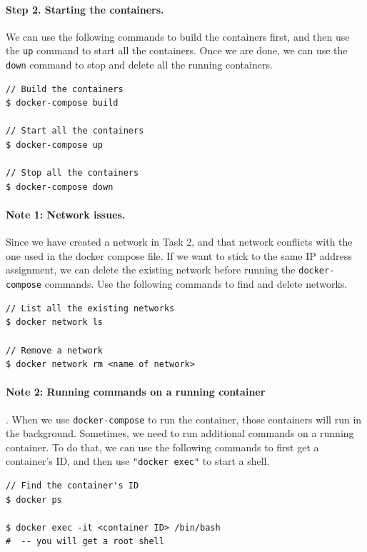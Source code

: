 \paragraph{Step 2. Starting the containers.}
We can use the following commands to build the containers first, and then 
use the \texttt{up} command to start all the containers. Once we are done,
we can use the \texttt{down} command to stop and delete all the running containers.  


\begin{lstlisting}
// Build the containers 
$ docker-compose build

// Start all the containers 
$ docker-compose up

// Stop all the containers
$ docker-compose down
\end{lstlisting}


\paragraph{Note 1: Network issues.}
Since we have created a network in Task 2, and that network
conflicts with the one used in the docker compose file. If we want to 
stick to the same IP address assignment, we can delete the existing 
network before running the \texttt{docker-compose} commands. 
Use the following commands to find and delete networks. 


\begin{lstlisting}
// List all the existing networks 
$ docker network ls 

// Remove a network
$ docker network rm <name of network>
\end{lstlisting}
 

\paragraph{Note 2: Running commands on a running container}.
When we use \texttt{docker-compose} to run the container, those 
containers will run in the background. 
Sometimes, we need to run additional commands on a running container.
To do that, we can use the following commands to first 
get a container's ID, and then use \texttt{"docker exec"} 
to start a shell. 


\begin{lstlisting}
// Find the container's ID 
$ docker ps 

$ docker exec -it <container ID> /bin/bash
#  -- you will get a root shell 
\end{lstlisting}
 



